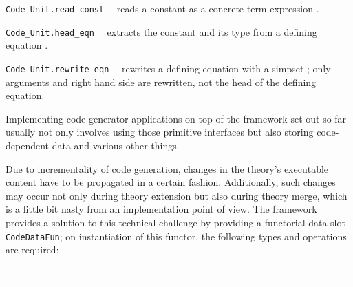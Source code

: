 \begin{isabellebody}
\begin{isamarkuptext}
  \begin{description}

  \item \verb|Code_Unit.read_const|~~
     reads a constant as a concrete term expression .

  \item \verb|Code_Unit.head_eqn|~~
     extracts the constant and its type from a defining equation .

  \item \verb|Code_Unit.rewrite_eqn|~~
     rewrites a defining equation  with a simpset ;
     only arguments and right hand side are rewritten,
     not the head of the defining equation.

  \end{description}%
\end{isamarkuptext}%
\isamarkuptrue%
%
\endisatagmlref
{\isafoldmlref}%
%
\isadelimmlref
%
\endisadelimmlref
%
\isamarkuptrue%
%
\begin{isamarkuptext}%
Implementing code generator applications on top
  of the framework set out so far usually not only
  involves using those primitive interfaces
  but also storing code-dependent data and various
  other things.%
\end{isamarkuptext}%
\isamarkuptrue%
%
\isamarkuptrue%
%
\begin{isamarkuptext}%
Due to incrementality of code generation, changes in the
  theory's executable content have to be propagated in a
  certain fashion.  Additionally, such changes may occur
  not only during theory extension but also during theory
  merge, which is a little bit nasty from an implementation
  point of view.  The framework provides a solution
  to this technical challenge by providing a functorial
  data slot \verb|CodeDataFun|; on instantiation
  of this functor, the following types and operations
  are required:

  \medskip
  \begin{tabular}{l}
  \isa{type\ T} \\
  \isa{val\ empty{\isacharcolon}\ T} \\
  \isa{val\ purge{\isacharcolon}\ theory\ {\isasymrightarrow}\ string\ list\ option\ {\isasymrightarrow}\ T\ {\isasymrightarrow}\ T}
  \end{tabular}


\end{isamarkuptext}
\end{isabellebody}
